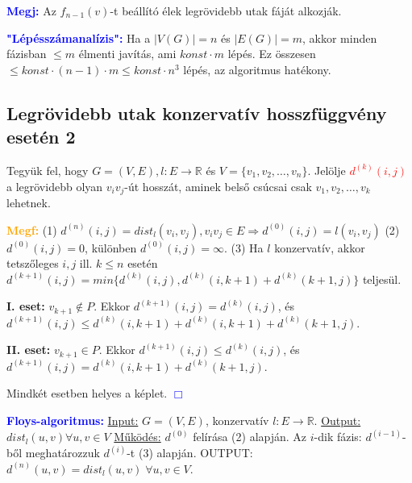 \documentclass[../szamtud.tex]{subfiles}
\begin{document}
        \textcolor{blue}{\textbf{Megj:}} Az $f_{n-1}(v)$-t beállító élek legrövidebb utak fáját alkozják. 


        \textcolor{blue}{\textbf{"Lépésszámanalízis":}} Ha a $|V(G)| = n$ és $|E(G)| = m$, akkor minden fázisban $\leq m$ élmenti javítás, ami $konst \cdot m$ lépés. Ez összesen $\leq konst \cdot (n-1) \cdot m \leq konst \cdot n^3$ lépés, az algoritmus hatékony.

    \subsection{Legrövidebb utak konzervatív hosszfüggvény esetén 2}

        Tegyük fel, hogy $G = (V,E), l:E \rightarrow \mathbb{R}$ és $V = \{v_1, v_2, \dots,v_n\}$. Jelölje \textcolor{red}{$d^{(k)}(i,j)$} a legrövidebb olyan $v_iv_j$-út hosszát, aminek belső csúcsai csak $v_1,v_2,\dots,v_k$ lehetnek.

        \textcolor{orange}{\textbf{Megf:}} (1) $d^{(n)}(i,j) = dist_l(v_i,v_j), v_iv_j \in E \Rightarrow d^{(0)}(i,j) = l(v_i,v_j)$ (2) $d^{(0)}(i,j) = 0$, különben $d^{(0)}(i,j) = \infty$. (3) Ha $l$ konzervatív, akkor tetszőleges $i,j$ ill. $k \leq n$ esetén $d^{(k+1)}(i,j) = min \{d^{(k)}(i,j), d^{(k)}(i,k+1)+d^{(k)}(k+1,j)\}$ teljesül.

        
        \textbf{I. eset:} $v_{k+1} \notin P$. Ekkor $d^{(k+1)}(i,j) = d^{(k)}(i,j)$, és $d^{(k+1)}(i,j) \leq d^{(k)}(i,k+1)+d^{(k)}(i,k+1)+d^{(k)}(k+1,j)$.

        \textbf{II. eset:} $v_{k+1} \in P$. Ekkor $d^{(k+1)}(i,j) \leq d^{(k)}(i,j)$, és $d^{(k+1)}(i,j) = d^{(k)}(i,k+1) + d^{(k)}(k+1,j)$.

        Mindkét esetben helyes a képlet.  \textcolor{blue}{$\Box$} 

        \textcolor{blue}{\textbf{Floys-algoritmus:}} \underline{Input:} $G = (V,E)$, konzervatív $l:E \rightarrow \mathbb{R}$. \underline{Output:} $dist_l(u,v)\forall u,v \in V$ \underline{Működés:} $d^{(0)}$ felírása (2) alapján. Az $i$-dik fázis: $d^{(i-1)}$-ből meghatározzuk $d^{(i)}$-t (3) alapján. OUTPUT: $d^{(n)}(u,v) = dist_l(u,v)\; \forall u,v \in V$.
\end{document}

